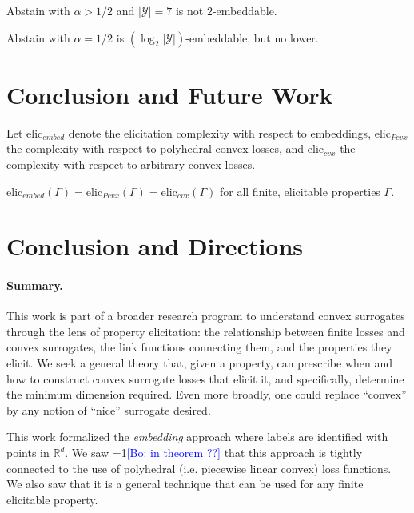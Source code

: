 \documentclass[anon,12pt]{colt2019}
\newcommand{\Comments}{1}
\newcommand{\mynote}[2]{\ifnum\Comments=1\textcolor{#1}{#2}\fi}
\newcommand{\bo}[1]{\mynote{blue}{[Bo: #1]}}
\newcommand{\reals}{\mathbb{R}}
\newcommand{\Y}{\mathcal{Y}}
\begin{document}
\begin{theorem}
  Abstain with $\alpha > 1/2$ and $|\Y|=7$ is not $2$-embeddable.
\end{theorem}

\begin{conjecture}
  Abstain with $\alpha=1/2$ is $(\log_2 |\Y|)$-embeddable, but no lower.
\end{conjecture}

\section{Conclusion and Future Work}

Let $\mathrm{elic}_{embed}$ denote the elicitation complexity with respect to embeddings, $\mathrm{elic}_{Pcvx}$ the complexity with respect to polyhedral convex losses, and $\mathrm{elic}_{cvx}$ the complexity with respect to arbitrary convex losses.

\begin{conjecture}
  $\mathrm{elic}_{embed}(\Gamma) = \mathrm{elic}_{Pcvx}(\Gamma) = \mathrm{elic}_{cvx}(\Gamma)$ for all finite, elicitable properties $\Gamma$.
\end{conjecture}


\section{Conclusion and Directions}  \label{sec:conclusion}
\paragraph{Summary.}
This work is part of a broader research program to understand convex surrogates through the lens of property elicitation: the relationship between finite losses and convex surrogates, the link functions connecting them, and the properties they elicit.
We seek a general theory that, given a property, can prescribe when and how to construct convex surrogate losses that elicit it, and specifically, determine the minimum dimension required.
Even more broadly, one could replace ``convex'' by any notion of ``nice'' surrogate desired.

This work formalized the \emph{embedding} approach where labels are identified with points in $\reals^d$.
We saw \bo{in theorem ??} that this approach is tightly connected to the use of polyhedral (i.e. piecewise linear convex) loss functions.
We also saw that it is a general technique that can be used for any finite elicitable property.
\end{document}
